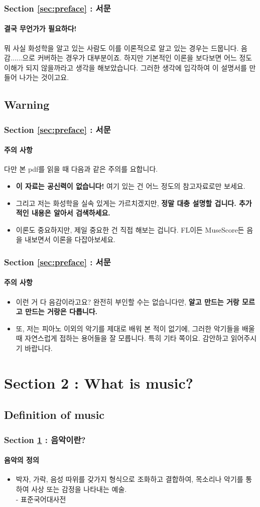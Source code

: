 \documentclass{beamer}
\begin{document}
	\begin{frame}
		\frametitle{Section \ref{sec:preface} : 서문}
		\framesubtitle{결국 무언가가 필요하다!}
		뭐 사실 화성학을 알고 있는 사람도 이를 이론적으로 알고 있는 경우는 드뭅니다. 음감......으로 커버하는 경우가 대부분이죠. 하지만 기본적인 이론을 보다보면 어느 정도 이해가 되지 않을까라고 생각을 해보았습니다. 그러한 생각에 입각하여 이 설명서를 만들어 나가는 것이고요.
	\end{frame}
	
	\subsection{Warning}
	\begin{frame}
		\frametitle{Section \ref{sec:preface} : 서문}
		\framesubtitle{주의 사항}
		다만 본 pdf를 읽을 때 다음과 같은 주의를 요합니다.
		\begin{itemize}
			\item {\bf 이 자료는 공신력이 없습니다!} 여기 있는 건 어느 정도의 참고자료로만 보세요.
			\item 그리고 저는 화성학을 실속 있게는 가르치겠지만, {\bf 정말 대충 설명할 겁니다. 추가적인 내용은 알아서 검색하세요.}
			\item 이론도 중요하지만, 제일 중요한 건 직접 해보는 겁니다. FL이든 MuseScore든 음을 내보면서 이론을 다잡아보세요.
		\end{itemize}
	\end{frame}
	
	\begin{frame}
		\frametitle{Section \ref{sec:preface} : 서문}
		\framesubtitle{주의 사항}
		\begin{itemize}
			\item 이런 거 다 음감이라고요? 완전히 부인할 수는 없습니다만, {\bf 알고 만드는 거랑 모르고 만드는 거랑은 다릅니다.}
			\item 또, 저는 피아노 이외의 악기를 제대로 배워 본 적이 없기에, 그러한 악기들을 배울 때 자연스럽게 접하는 용어들을 잘 모릅니다. 특히 기타 쪽이요. 감안하고 읽어주시기 바랍니다.
		\end{itemize}
	\end{frame}
	
	\section{Section 2 : What is music?}\label{sec:music}
	\subsection{Definition of music}
	\begin{frame}
		\frametitle{Section \ref{sec:music} : 음악이란?}
		\framesubtitle{음악의 정의}
		\begin{definition}[음악, 音樂, Music]
			\begin{itemize}
				\item 박자, 가락, 음성 따위를 갖가지 형식으로 조화하고 결합하여, 목소리나 악기를 통하여 사상 또는 감정을 나타내는 예술. \\- 표준국어대사전
			\end{itemize}
		\end{definition}
	\end{frame}
	
\end{document}
